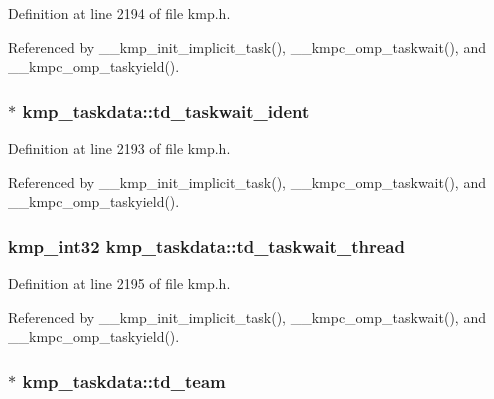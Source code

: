 Definition at line 2194 of file kmp.\-h.



Referenced by \-\_\-\-\_\-kmp\-\_\-init\-\_\-implicit\-\_\-task(), \-\_\-\-\_\-kmpc\-\_\-omp\-\_\-taskwait(), and \-\_\-\-\_\-kmpc\-\_\-omp\-\_\-taskyield().

\hypertarget{structkmp__taskdata_a11ddd31b5102384ab645eef338e40bf3}{
\subsubsection[{td\-\_\-taskwait\-\_\-ident}]{$\ast$ kmp\-\_\-taskdata\-::td\-\_\-taskwait\-\_\-ident}}\label{structkmp__taskdata_a11ddd31b5102384ab645eef338e40bf3}


Definition at line 2193 of file kmp.\-h.



Referenced by \-\_\-\-\_\-kmp\-\_\-init\-\_\-implicit\-\_\-task(), \-\_\-\-\_\-kmpc\-\_\-omp\-\_\-taskwait(), and \-\_\-\-\_\-kmpc\-\_\-omp\-\_\-taskyield().

\hypertarget{structkmp__taskdata_a9721521ef95aac2b984b2ee053c3be9a}{
\subsubsection[{td\-\_\-taskwait\-\_\-thread}]{\setlength{\rightskip}{0pt plus 5cm}kmp\-\_\-int32 kmp\-\_\-taskdata\-::td\-\_\-taskwait\-\_\-thread}}\label{structkmp__taskdata_a9721521ef95aac2b984b2ee053c3be9a}


Definition at line 2195 of file kmp.\-h.



Referenced by \-\_\-\-\_\-kmp\-\_\-init\-\_\-implicit\-\_\-task(), \-\_\-\-\_\-kmpc\-\_\-omp\-\_\-taskwait(), and \-\_\-\-\_\-kmpc\-\_\-omp\-\_\-taskyield().

\hypertarget{structkmp__taskdata_a2ca48086b6f95cea53c615b83a94e424}{
\subsubsection[{td\-\_\-team}]{$\ast$ kmp\-\_\-taskdata\-::td\-\_\-team}}\label{structkmp__taskdata_a2ca48086b6f95cea53c615b83a94e424}


